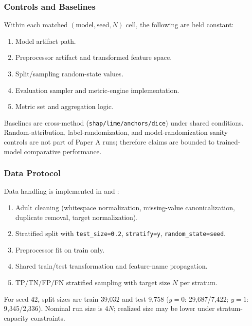\documentclass[twoside,11pt]{article}
\begin{document}
\subsubsection{Controls and Baselines}
Within each matched $(\text{model},\text{seed},N)$ cell, the following are held
constant:
\begin{enumerate}[leftmargin=*]
    \item Model artifact path.
    \item Preprocessor artifact and transformed feature space.
    \item Split/sampling random-state values.
    \item Evaluation sampler and metric-engine implementation.
    \item Metric set and aggregation logic.
\end{enumerate}
Baselines are cross-method (\texttt{shap/lime/anchors/dice}) under shared
conditions. Random-attribution, label-randomization, and
model-randomization sanity controls are not part of Paper A runs; therefore
claims are bounded to trained-model comparative performance.

\subsubsection{Data Protocol}
Data handling is implemented in  and
:
\begin{enumerate}[leftmargin=*]
    \item Adult cleaning (whitespace normalization, missing-value canonicalization, duplicate removal, target normalization).
    \item Stratified split with \texttt{test\_size=0.2}, \texttt{stratify=y}, \texttt{random\_state=seed}.
    \item Preprocessor fit on train only.
    \item Shared train/test transformation and feature-name propagation.
    \item TP/TN/FP/FN stratified sampling with target size $N$ per stratum.
\end{enumerate}
For seed 42, split sizes are train 39,032 and test 9,758
($y=0$: 29,687/7,422; $y=1$: 9,345/2,336). Nominal run size is $4N$; realized
size may be lower under stratum-capacity constraints.
\end{document}
